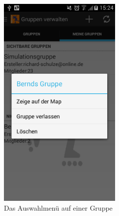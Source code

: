 \begin{figure}[htb]
\centering
\includegraphics[width=6cm]{graphics/Nutzergruppen_selections_menu.png}
\caption{Das Auswahlmenü auf einer Gruppe}
\label{fig:usergroups_selections_menu}
\end{figure}


